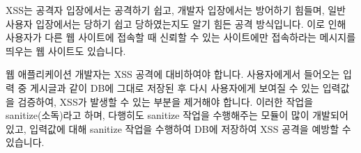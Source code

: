 XSS는 공격자 입장에서는 공격하기 쉽고, 개발자 입장에서는 방어하기 힘들며, 일반 사용자 입장에서는 당하기 쉽고 당하였는지도 알기 힘든 공격 방식입니다. 이로 인해 사용자가 다른 웹 사이트에 접속할 때 신뢰할 수 있는 사이트에만 접속하라는 메시지를 띄우는 웹 사이트도 있습니다.

웹 애플리케이션 개발자는 XSS 공격에 대비하여야 합니다. 사용자에게서 들어오는 입력 중 게시글과 같이 DB에 그대로 저장된 후 다시 사용자에게 보여질 수 있는 입력값을 검증하여, XSS가 발생할 수 있는 부분을 제거해야 합니다. 이러한 작업을 sanitize(소독)라고 하며, 다행히도 sanitize 작업을 수행해주는 모듈이 많이 개발되어 있고, 입력값에 대해 sanitize 작업을 수행하여 DB에 저장하여 XSS 공격을 예방할 수 있습니다.
